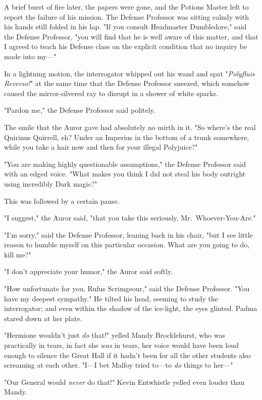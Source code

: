 A brief burst of fire later, the papers were gone, and the Potions Master left to report the failure of his mission.
\sbreak
The Defense Professor was sitting calmly with his hands still folded in his lap. "If you consult Headmaster Dumbledore," said the Defense Professor, "you will find that he is well aware of this matter, and that I agreed to teach his Defense class on the explicit condition that no inquiry be made into my---"

In a lightning motion, the interrogator whipped out his wand and spat "\emph{Polyfluis Reverso!}" at the same time that the Defense Professor sneezed, which somehow caused the mirror-silvered ray to disrupt in a shower of white sparks.

"Pardon me," the Defense Professor said politely.

The smile that the Auror gave had absolutely no mirth in it. "So where's the real Quirinus Quirrell, eh? Under an Imperius in the bottom of a trunk somewhere, while you take a hair now and then for your illegal Polyjuice?"

"You are making highly questionable assumptions," the Defense Professor said with an edged voice. "What makes you think I did not steal his body outright using incredibly Dark magic?"

This was followed by a certain pause.

"I suggest," the Auror said, "that you take this seriously, Mr.~Whoever-You-Are."

"I'm sorry," said the Defense Professor, leaning back in his chair, "but I see little reason to humble myself on this particular occasion. What are you going to do, kill me?"

"I don't appreciate your humor," the Auror said softly.

"How unfortunate for you, Rufus Scrimgeour," said the Defense Professor. "You have my deepest sympathy." He tilted his head, seeming to study the interrogator; and even within the shadow of the ice-light, the eyes glinted.
\sbreak
Padma stared down at her plate.

"Hermione wouldn't just \emph{do} that!" yelled Mandy Brocklehurst, who was practically in tears, in fact she \emph{was} in tears, her voice would have been loud enough to silence the Great Hall if it hadn't been for all the other students also screaming at each other. "I---I bet Malfoy tried to---to \emph{do} things to her---"

"Our General would \emph{never} do that!" Kevin Entwhistle yelled even louder than Mandy.

